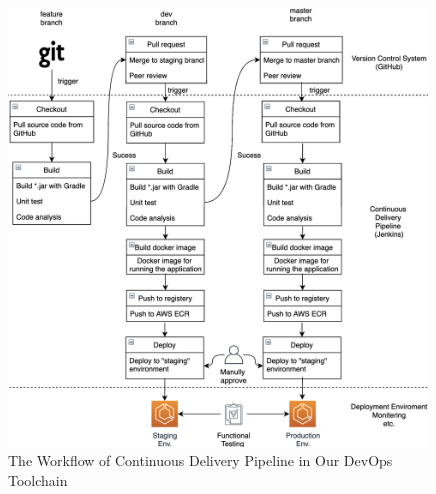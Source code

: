 \begin{figure}[h]
    \centering
    \includegraphics[width=0.99\textwidth]{pics/pipeline.png}
    \caption{The Workflow of Continuous Delivery Pipeline in Our DevOps Toolchain}
    \label{fig:pipeline}
\end{figure}
